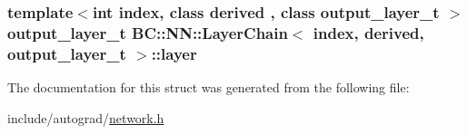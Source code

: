 \subsubsection[{\texorpdfstring{layer}{layer}}]{\setlength{\rightskip}{0pt plus 5cm}template$<$int index, class derived , class output\+\_\+layer\+\_\+t $>$ output\+\_\+layer\+\_\+t {\bf B\+C\+::\+N\+N\+::\+Layer\+Chain}$<$ index, derived, output\+\_\+layer\+\_\+t $>$\+::layer}\hypertarget{structBC_1_1NN_1_1LayerChain_3_01index_00_01derived_00_01output__layer__t_01_4_a7369e01b1ccca85830babb7e8973c893}{}\label{structBC_1_1NN_1_1LayerChain_3_01index_00_01derived_00_01output__layer__t_01_4_a7369e01b1ccca85830babb7e8973c893}


The documentation for this struct was generated from the following file\+:\begin{DoxyCompactItemize}
\item 
include/autograd/\hyperlink{network_8h}{network.\+h}\end{DoxyCompactItemize}
